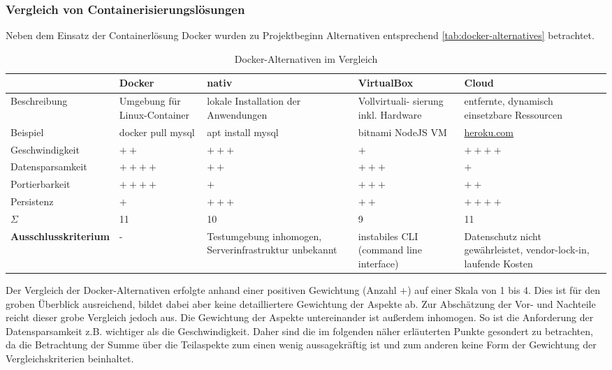 \subsubsection{Vergleich von Containerisierungslösungen}
Neben dem Einsatz der Containerlösung Docker wurden zu Projektbeginn Alternativen entsprechend \autoref{tab:docker-alternatives} betrachtet.

\begin{table}[H]
    \centering
    \begin{tabularx}{\textwidth}{|l|X|X|X|X|}
        \hline
        & \textbf{Docker} & \textbf{nativ} & \textbf{VirtualBox} & \textbf{Cloud} \\
        \hline
        Beschreibung & Umgebung für Linux-Container & lokale Installation der Anwendungen & Vollvirtuali- sierung inkl. Hardware & entfernte, dynamisch einsetzbare Ressourcen \\
        \hline
        Beispiel & docker pull mysql & apt install mysql & bitnami NodeJS VM & \url{heroku.com} \\
        \hline
        Geschwindigkeit     & $++$      & $+++$     & $+$   & $++++$ \\
        \hline
        Datensparsamkeit    & $++++$    & $++$      & $+++$ & $+$ \\
        \hline
        Portierbarkeit      & $++++$    & $+$       & $+++$ & $++$ \\
        \hline
        Persistenz          & $+$       & $+++$     & $++$  & $++++$ \\
        \hline
        \hline
        $\Sigma$            & 11        & 10        & 9     & 11 \\ 
        \hline
        \textbf{Ausschlusskriterium} & - & Testumgebung inhomogen, Serverinfrastruktur unbekannt & instabiles CLI (command line interface) & Datenschutz nicht gewährleistet, vendor-lock-in, laufende Kosten \\
        \hline
    \end{tabularx}
    \caption{Docker-Alternativen im Vergleich}
    \label{tab:docker-alternatives}
\end{table}

Der Vergleich der Docker-Alternativen erfolgte anhand einer positiven Gewichtung (Anzahl $+$) auf einer Skala von 1 bis 4. Dies ist für den groben Überblick ausreichend, bildet dabei aber keine detailliertere Gewichtung der Aspekte ab. Zur Abschätzung der Vor- und Nachteile reicht dieser grobe Vergleich jedoch aus. Die Gewichtung der Aspekte untereinander ist außerdem inhomogen. So ist die Anforderung der Datensparsamkeit z.B. wichtiger als die Geschwindigkeit. Daher sind die im folgenden näher erläuterten Punkte gesondert zu betrachten, da die Betrachtung der Summe über die Teilaspekte zum einen wenig aussagekräftig ist und zum anderen keine Form der Gewichtung der Vergleichskriterien beinhaltet.

